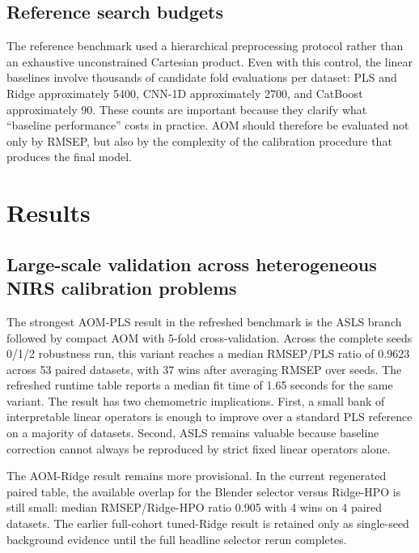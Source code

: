 \documentclass[11pt,a4paper]{article}
\begin{document}
\subsection{Reference search budgets}

The reference benchmark used a hierarchical preprocessing protocol rather than
an exhaustive unconstrained Cartesian product.  Even with this control, the
linear baselines involve thousands of candidate fold evaluations per dataset:
PLS and Ridge approximately 5400, CNN-1D approximately 2700, and CatBoost
approximately 90.  These counts are important because they clarify what
``baseline performance'' costs in practice.  AOM should therefore be evaluated
not only by RMSEP, but also by the complexity of the calibration procedure that
produces the final model.

\begin{table}[t]
  \centering
  \caption{Search-budget contrast under the local reference benchmark
  protocol.}
  \label{tab:budget}
  \small
  
\end{table}

\section{Results}

\subsection{Large-scale validation across heterogeneous NIRS calibration problems}

The strongest AOM-PLS result in the refreshed benchmark is the ASLS branch
followed by compact AOM with 5-fold cross-validation.  Across the complete
seeds 0/1/2 robustness run, this variant reaches a median RMSEP/PLS ratio of
0.9623 across 53 paired datasets, with 37 wins after averaging RMSEP over
seeds.  The refreshed runtime table reports a median fit time of 1.65 seconds
for the same variant.  The result has two chemometric implications.  First, a
small bank of interpretable linear operators is enough to improve over a
standard PLS reference on a majority of datasets.  Second, ASLS remains
valuable because baseline correction cannot always be reproduced by strict
fixed linear operators alone.

The AOM-Ridge result remains more provisional.  In the current regenerated
paired table, the available overlap for the Blender selector versus
Ridge-HPO is still small: median RMSEP/Ridge-HPO ratio 0.905 with 4 wins on 4
paired datasets.  The earlier full-cohort tuned-Ridge result is retained only
as single-seed background evidence until the full headline selector rerun
completes.
\end{document}
